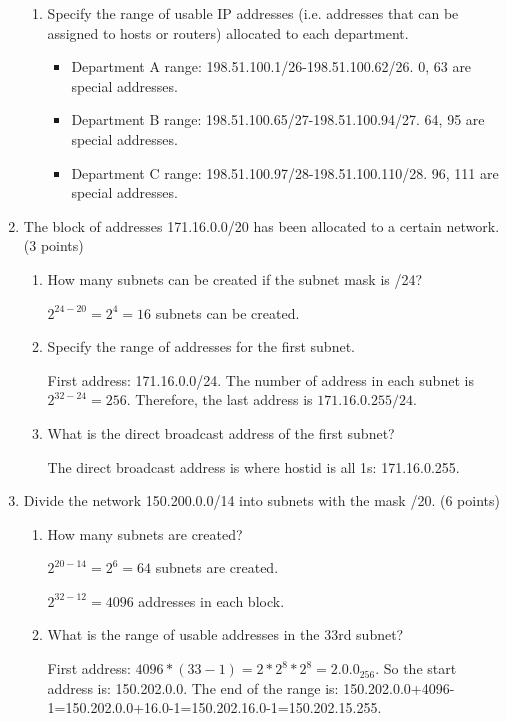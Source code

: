 \documentclass{article}
\begin{document}
\begin{enumerate}
\begin{enumerate}
    \item Specify the range of usable IP addresses (i.e. addresses that can be assigned to hosts or routers) allocated to each department.
    \begin{itemize}
      \item Department A range: 198.51.100.1/26-198.51.100.62/26. 0, 63 are special addresses.
      \item Department B range: 198.51.100.65/27-198.51.100.94/27. 64, 95 are special addresses.
      \item Department C range: 198.51.100.97/28-198.51.100.110/28. 96, 111 are special addresses.
    \end{itemize}
  \end{enumerate}

  \item The block of addresses 171.16.0.0/20 has been allocated to a certain network. (3 points)
  \begin{enumerate}
    \item How many subnets can be created if the subnet mask is /24?

    $2^{24-20}=2^4=16$ subnets can be created.

    \item Specify the range of addresses for the first subnet.

    First address: 171.16.0.0/24. The number of address in each subnet is $2^{32-24}=256$. Therefore, the last address is $171.16.0.255/24$.

    \item What is the direct broadcast address of the first subnet?

    The direct broadcast address is where hostid is all 1s: 171.16.0.255.
  \end{enumerate}

  \item Divide the network 150.200.0.0/14 into subnets with the mask /20. (6 points)
  \begin{enumerate}
    \item How many subnets are created?
    
    $2^{20-14}=2^6=64$ subnets are created.

    $2^{32-12}=4096$ addresses in each block.

    \item What is the range of usable addresses in the 33rd subnet?
    
    First address: $4096*(33-1)=2*2^8*2^8=2.0.0_{256}$. So the start address is: 150.202.0.0.
    The end of the range is: 150.202.0.0+4096-1=150.202.0.0+16.0-1=150.202.16.0-1=150.202.15.255.


\end{enumerate}
\end{enumerate}
\end{document}
